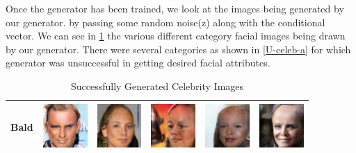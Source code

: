Once the generator has been trained, we look at the images being generated by our generator. by passing some random noise(z) along with the conditional vector. We can see in \cref{Celeb-a} the various different category facial images being drawn by our generator. There were several categories as shown in \cref{U-celeb-a} for which generator was unsuccessful in getting desired facial attributes.

  

\begin{table}[ht]
\centering
\caption{Successfully Generated Celebrity Images}
\label{Celeb-a}
\begin{tabular}{|llllll|}
\hline
Bald & \includegraphics[width=1.69cm, height=1.69cm]{Files/images/images1/image100.png}  &\includegraphics[width=1.69cm, height=1.69cm]{Files/images/images1/image2.png}   & \includegraphics[width=1.69cm, height=1.69cm]{Files/images/images1/image3.png}  & \includegraphics[width=1.69cm, height=1.69cm]{Files/images/images1/image52.png}  & \includegraphics[width=1.69cm, height=1.69cm]{Files/images/images1/image68.png} \\ \hline



\end{tabular}
\end{table}
